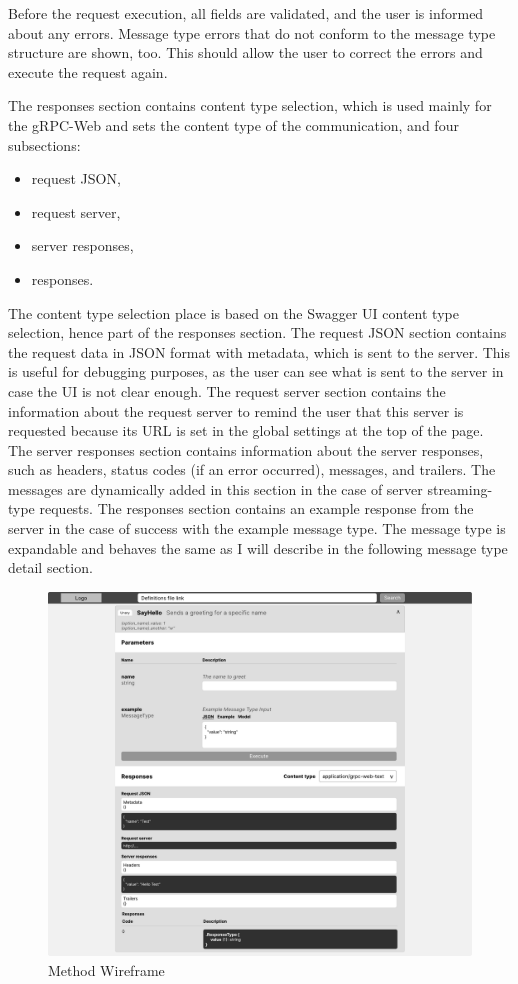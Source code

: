 Before the request execution, all fields are validated, and the user is informed about any errors.
Message type errors that do not conform to the message type structure are shown, too.
This should allow the user to correct the errors and execute the request again.

The responses section contains content type selection, which is used mainly for the gRPC-Web and sets the content type of the communication, and four subsections:
\begin{itemize}
    \item request JSON,
    \item request server,
    \item server responses,
    \item responses.
\end{itemize}

The content type selection place is based on the Swagger UI content type selection, hence part of the responses section.
The request JSON section contains the request data in JSON format with metadata, which is sent to the server.
This is useful for debugging purposes, as the user can see what is sent to the server in case the UI is not clear enough.
The request server section contains the information about the request server to remind the user that this server is requested because its URL is set in the global settings at the top of the page.
The server responses section contains information about the server responses, such as headers, status codes (if an error occurred), messages, and trailers.
The messages are dynamically added in this section in the case of server streaming-type requests.
The responses section contains an example response from the server in the case of success with the example message type.
The message type is expandable and behaves the same as I will describe in the following message type detail section.


\begin{figure}[hbt!]
    \centering
    \captionsetup{justification=centering}
    \includegraphics[width=1.0\textwidth]{images/design/wireframes/method}
    \caption{Method Wireframe}
    \label{fig:wireframe-method}
\end{figure}

